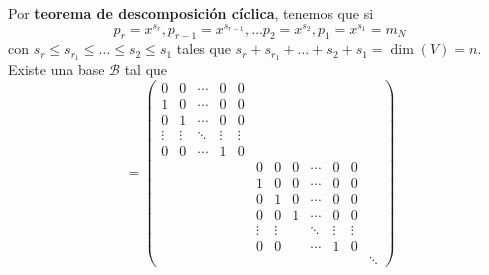 Por \textbf{teorema de descomposición cíclica}, tenemos que si
$$
p_r=x^{s_r},
p_{r-1}=x^{s_{r-1}},
\dots
p_2=x^{s_2},
p_1=x^{s_1}=m_N
$$
con $s_r \leq s_{r_1} \leq \dots \leq s_2 \leq s_1$ tales que
$s_r + s_{r_1} + \dots + s_2 + s_1 =\dim(V)=n$. Existe una base
$\mathcal{B}$ tal que
\begin{equation*}[N]=\left(
\begin{smallmatrix}
0      & 0      & \cdots & 0      & 0      &        &          &        &        &        &        &\\
1      & 0      & \cdots & 0      & 0      &        &          &        &        &        &        &\\
0      & 1      & \cdots & 0      & 0      &        &          &        &        &        &        &\\
\vdots & \vdots & \ddots & \vdots & \vdots &        &          &        &        &        &        &\\
0      & 0      & \cdots & 1      & 0      &        &          &        &        &        &        &\\
       &        &        &        &        & 0      & 0      & 0        & \cdots & 0      & 0      &\\
       &        &        &        &        & 1      & 0      & 0        & \cdots & 0      & 0      &\\
       &        &        &        &        & 0      & 1      & 0        & \cdots & 0      & 0      &\\
       &        &        &        &        & 0      & 0      & 1        & \cdots & 0      & 0      &\\
       &        &        &        &        & \vdots & \vdots &          & \ddots & \vdots & \vdots &\\
       &        &        &        &        & 0      & 0      &          & \cdots & 1      & 0      &\\
       &        &        &        &        &        &        &          &        &        &        &\ddots 
    \end{smallmatrix}\right)
\end{equation*}


